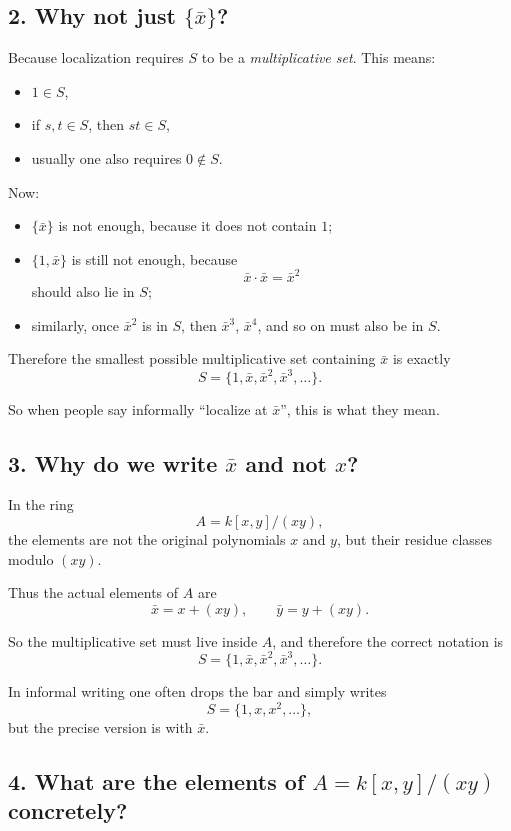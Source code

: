 \documentclass[12pt,a4paper]{article}
\theoremstyle{notespace}
\begin{document}
\subsection{2. Why not just \(\{\bar x\}\)?}

Because localization requires \(S\) to be a \emph{multiplicative set}. This means:

\begin{itemize}
	\item \(1\in S\),
	\item if \(s,t\in S\), then \(st\in S\),
	\item usually one also requires \(0\notin S\).
\end{itemize}

Now:

\begin{itemize}
	\item \(\{\bar x\}\) is not enough, because it does not contain \(1\);
	\item \(\{1,\bar x\}\) is still not enough, because
	\[
	\bar x\cdot \bar x=\bar x^2
	\]
	should also lie in \(S\);
	\item similarly, once \(\bar x^2\) is in \(S\), then \(\bar x^3\), \(\bar x^4\), and so on must also be in \(S\).
\end{itemize}

Therefore the smallest possible multiplicative set containing \(\bar x\) is exactly
\[
S=\{1,\bar x,\bar x^2,\bar x^3,\dots\}.
\]

So when people say informally ``localize at \(\bar x\)'', this is what they mean.

\subsection{3. Why do we write \(\bar x\) and not \(x\)?}

In the ring
\[
A=k[x,y]/(xy),
\]
the elements are not the original polynomials \(x\) and \(y\), but their residue classes modulo \((xy)\).

Thus the actual elements of \(A\) are
\[
\bar x=x+(xy), \qquad \bar y=y+(xy).
\]

So the multiplicative set must live inside \(A\), and therefore the correct notation is
\[
S=\{1,\bar x,\bar x^2,\bar x^3,\dots\}.
\]

In informal writing one often drops the bar and simply writes
\[
S=\{1,x,x^2,\dots\},
\]
but the precise version is with \(\bar x\).

\subsection{4. What are the elements of \(A=k[x,y]/(xy)\) concretely?}
\end{document}
